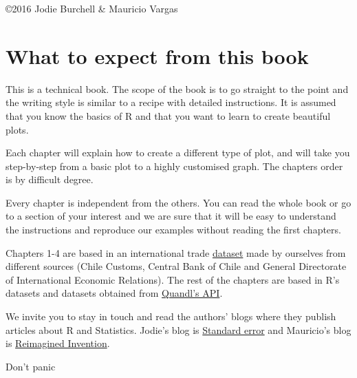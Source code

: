 \documentclass[11pt, oneside]{report}
\begin{document}
\copyright 2016 Jodie Burchell \& Mauricio Vargas

\newpage
\tableofcontents
\newpage

%
%

\setcounter{page}{1}

\chapter*{What to expect from this book}

This is a technical book. The scope of the book is to go straight to the point and the writing style is similar to a recipe with detailed instructions. It is assumed that you know the basics of R and that you want to learn to create beautiful plots. 

Each chapter will explain how to create a different type of plot, and will take you step-by-step from a basic plot to a highly customised graph. The chapters order is by difficult degree.

Every chapter is independent from the others. You can read the whole book or go to a section of your interest and we are sure that it will be easy to understand the instructions and reproduce our examples without reading the first chapters.

Chapters 1-4 are based in an international trade
\href{http://pachamaltese.github.io/stats/trade-chile-china/copper-data-for-chapter.csv}{dataset}
made by ourselves from different sources (Chile Customs, Central Bank of
Chile and General Directorate of International Economic Relations). The rest of the chapters are based in R's datasets and datasets obtained from \href{https://www.quandl.com/}{Quandl's API}.

We invite you to stay in touch and read the authors' blogs where they publish articles about R and Statistics. Jodie's blog is \href{http://t-redactyl.io/}{Standard error} and Mauricio's blog is \href{http://pachamaltese.github.io/}{Reimagined Invention}.

\bigskip
\bigskip
\bigskip

\begin{center}
Don't panic
\end{center}

\end{document}
